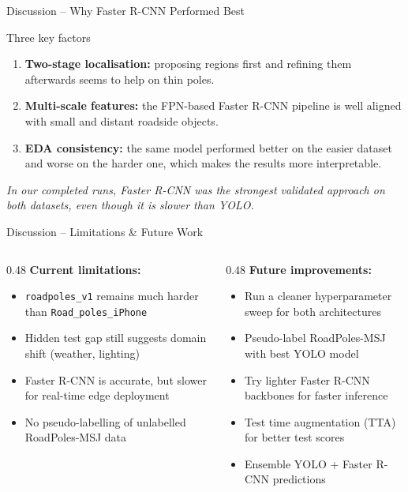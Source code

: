 \documentclass[aspectratio=169]{beamer}
\begin{document}
\begin{frame}{Discussion -- Why Faster R-CNN Performed Best}
  \begin{block}{Three key factors}
    \begin{enumerate}
      \item \textbf{Two-stage localisation:} proposing regions first and refining them afterwards seems to help on thin poles.
      \item \textbf{Multi-scale features:} the FPN-based Faster R-CNN pipeline is well aligned with small and distant roadside objects.
      \item \textbf{EDA consistency:} the same model performed better on the easier dataset and worse on the harder one, which makes the results more interpretable.
    \end{enumerate}
  \end{block}
  \vspace{0.3em}
  \textit{In our completed runs, Faster R-CNN was the strongest validated approach on both datasets, even though it is slower than YOLO.}
\end{frame}

\begin{frame}{Discussion -- Limitations \& Future Work}
  \begin{columns}
    \begin{column}{0.48\textwidth}
      \textbf{Current limitations:}
      \begin{itemize}
        \item \texttt{roadpoles\_v1} remains much harder than \texttt{Road\_poles\_iPhone}
        \item Hidden test gap still suggests domain shift (weather, lighting)
        \item Faster R-CNN is accurate, but slower for real-time edge deployment
        \item No pseudo-labelling of unlabelled RoadPoles-MSJ data
      \end{itemize}
    \end{column}
    \begin{column}{0.48\textwidth}
      \textbf{Future improvements:}
      \begin{itemize}
        \item Run a cleaner hyperparameter sweep for both architectures
        \item Pseudo-label RoadPoles-MSJ with best YOLO model
        \item Try lighter Faster R-CNN backbones for faster inference
        \item Test time augmentation (TTA) for better test scores
        \item Ensemble YOLO + Faster R-CNN predictions
      \end{itemize}
    \end{column}
  \end{columns}
\end{frame}
\end{document}
